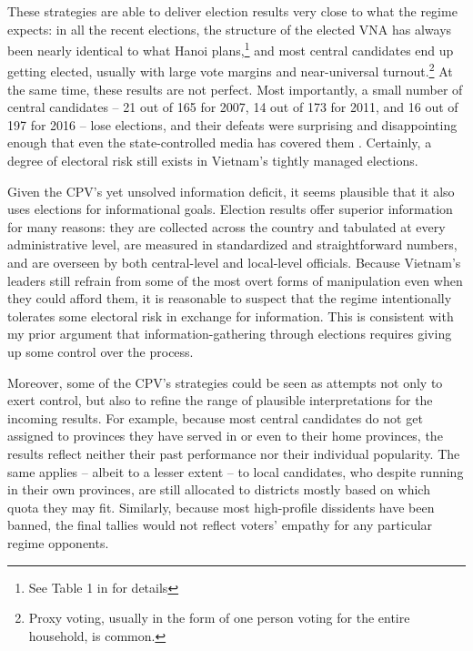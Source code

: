 \documentclass[12pt]{article}
\newcommand\fnote[1]{\footnote{\baselineskip=2\normalbaselineskip#1}}
\newcommand{\1}{\mathbbm{1}}
\begin{document}
These strategies are able to deliver election results very close to what the regime expects: in all the recent elections, the structure of the elected VNA has always been nearly identical to what Hanoi plans,\fnote{See Table 1 in \citet[][506]{MaleskySchuler2011} for  details} and most central candidates end up getting elected, usually with large vote margins and near-universal turnout.\fnote{Proxy voting, usually in the form of one person voting for the entire household, is common.} At the same time, these results are not perfect. Most importantly, a small number of central candidates -- 21 out of 165 for 2007, 14 out of 173 for 2011, and 16 out of 197 for 2016 -- lose elections, and their defeats were surprising and disappointing enough that even the state-controlled media has covered them \citep[e.g.][]{vov2016}. Certainly, a degree of electoral risk still exists in Vietnam's tightly managed elections.

Given the CPV's yet unsolved information deficit, it seems plausible that it also uses elections for informational goals. Election results offer superior information for many reasons: they are collected across the country and tabulated at every administrative level, are measured in standardized and straightforward numbers, and are overseen by both central-level and local-level officials. Because Vietnam's leaders still refrain from some of the most overt forms of manipulation even when they could afford them, it is reasonable to suspect that the regime intentionally tolerates some electoral risk in exchange for information. This is consistent with my prior argument that information-gathering through elections requires giving up some control over the process.

Moreover, some of the CPV's strategies could be seen as attempts not only to exert control, but also to refine the range of plausible interpretations for the incoming results. For example, because most central candidates do not get assigned to provinces they have served in or even to their home provinces, the results reflect neither their past performance nor their individual popularity. The same applies -- albeit to a lesser extent -- to local candidates, who despite running in their own provinces, are still allocated to districts mostly based on which quota they may fit. Similarly, because most high-profile dissidents have been banned, the final tallies would not reflect voters' empathy for any particular regime opponents.
\end{document}
